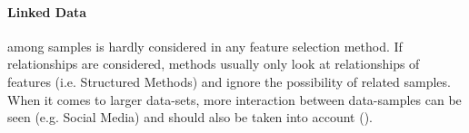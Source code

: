 \paragraph{Linked Data} among samples is hardly considered in any feature
selection method. If relationships are considered, methods usually only look at
relationships of features (i.e. Structured Methods) and ignore the possibility
of related samples. When it comes to larger data-sets, more interaction between
data-samples can be seen (e.g. Social Media) and should also be taken into
account (\cite{Tang:14}).


